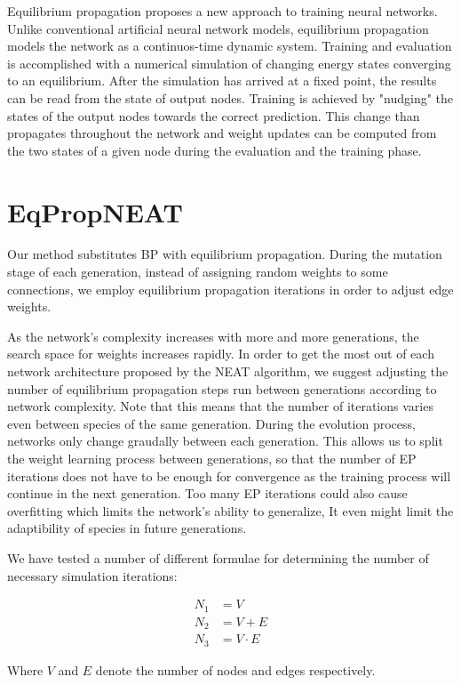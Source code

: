 \documentclass[lettersize,journal]{IEEEtran}
\newcommand{\eqprop}{EP }
\begin{document}
Equilibrium propagation proposes a new approach to training neural networks. Unlike conventional artificial neural network models, equilibrium propagation models the network as a continuos-time dynamic system. Training and evaluation is accomplished with a numerical simulation of changing energy states converging to an equilibrium. After the simulation has arrived at a fixed point, the results can be read from the state of output nodes. Training is achieved by "nudging" the states of the output nodes towards the correct prediction. This change than propagates throughout the network and weight updates can be computed from the two states of a given node during the evaluation and the training phase.

\section{EqPropNEAT}
Our method substitutes BP with equilibrium propagation. During the mutation stage of each generation, instead of assigning random weights to some connections, we employ equilibrium propagation iterations in order to adjust edge weights.

As the network's complexity increases with more and more generations, the search space for weights increases rapidly. In order to get the most out of each network architecture proposed by the NEAT algorithm, we suggest adjusting the number of equilibrium propagation steps run between generations according to network complexity. Note that this means that the number of iterations varies even between species of the same generation. During the evolution process, networks only change graudally between each generation. This allows us to split the weight learning process between generations, so that the number of \eqprop iterations does not have to be enough for convergence as the training process will continue in the next generation. Too many \eqprop iterations could also cause overfitting which limits the network's ability to generalize, It even might limit the adaptibility of species in future generations. 

We have tested a number of different formulae for determining the number of necessary simulation iterations:

\begin{align}
  N_1 &= V\\
  N_2 &= V+E\\
  N_3 &= V\cdot E
\end{align}

Where $V$ and $E$ denote the number of nodes and edges respectively. 
\end{document}
